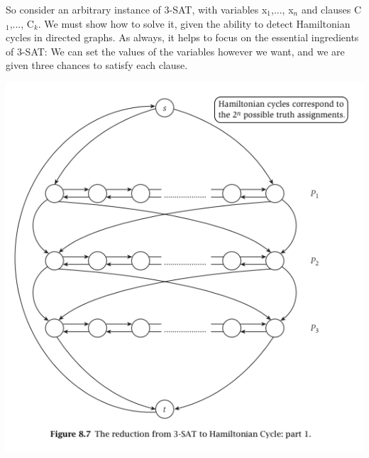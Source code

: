 \documentclass{article}
\begin{document}
So consider an arbitrary instance of 3-SAT, with variables x$_1$,..., x$_n$ and clauses C$_1$,..., C$_k$. We must show how to solve it, given the ability to detect
Hamiltonian cycles in directed graphs. As always, it helps to focus on the essential ingredients of 3-SAT: We can set the values of the variables however we want, and we are given three chances to satisfy each clause.

\begin{center}
    \includegraphics[]{figures/fig28.png}
\end{center}
\end{document}
